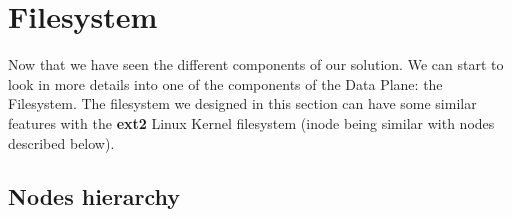 \documentclass[../main.tex]{subfiles}
\begin{document}
\section{Filesystem}
\label{section:lauxus:filesystem}
\par Now that we have seen the different components of our solution. We can start to look in more details into one of the components of the Data Plane: the Filesystem. The filesystem we designed in this section can have some similar features with the \textbf{ext2} Linux Kernel filesystem (inode being similar with nodes described below).

\subsection{Nodes hierarchy}
\label{section:lauxus:filesystem_nodes}
\end{document}
